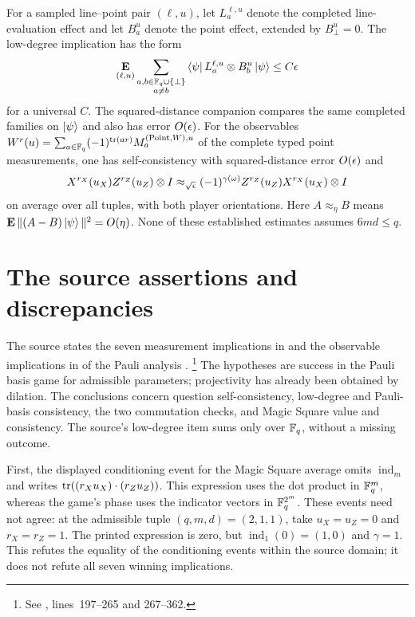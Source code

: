 \documentclass[11pt]{article}
\newcommand{\ind}{\operatorname{ind}}
\begin{document}
For a sampled line--point pair $(\ell,u)$, let $L_a^{\ell,u}$ denote the
completed line-evaluation effect and let $B_a^u$ denote the point effect,
extended by $B_\bot^u=0$. The low-degree implication has the form
\[
  \mathop{\bf E\/}_{(\ell,u)}\sum_{\substack{a,b\in\mathbb{F}_q\cup\{\bot\}\\a\ne b}}
    \bra\psi L_a^{\ell,u}\otimes B_b^u\ket\psi\leq C\epsilon
\]
for a universal $C$. The squared-distance companion compares the same
completed families on $\ket\psi$ and also has error $O(\epsilon)$.
For the observables
$W^r(u)=\sum_{a\in\mathbb{F}_q}(-1)^{\mathrm{tr}(ar)}M^{(\mathrm{Point},W),u}_a$
of the complete typed point measurements, one has self-consistency with
squared-distance error $O(\epsilon)$ and
\[
  X^{r_X}(u_X)Z^{r_Z}(u_Z)\otimes I
  \approx_{\sqrt{\epsilon}}
  (-1)^{\gamma(\omega)}Z^{r_Z}(u_Z)X^{r_X}(u_X)\otimes I
\]
on average over all tuples, with both player orientations. Here
$A\approx_\eta B$ means $\mathop{\bf E\/}\|(A-B)\ket\psi\|^2=O(\eta)$.
None of these established estimates assumes $6md\leq q$.

\section{The source assertions and discrepancies}

The source states the seven measurement implications in
 and the observable implications in
 of the Pauli analysis
\cite[Appendix~A, Strategies]{Ji2020MIPStar}.%
\footnote{See
,
lines~197--265 and 267--362.}
The hypotheses are success in the Pauli basis game for admissible parameters;
projectivity has already been obtained by dilation. The conclusions concern
question self-consistency, low-degree and Pauli-basis consistency, the two
commutation checks, and Magic Square value and consistency. The source's
low-degree item sums only over $\mathbb{F}_q$, without a missing outcome.

First, the displayed conditioning event for the Magic Square average omits
$\ind_m$ and writes $\mathrm{tr}((r_Xu_X)\cdot(r_Zu_Z))$. This expression uses the
dot product in $\mathbb{F}_q^m$, whereas the game's phase uses the indicator vectors
in $\mathbb{F}_q^{2^m}$. These events need not agree: at the admissible tuple
$(q,m,d)=(2,1,1)$, take $u_X=u_Z=0$ and $r_X=r_Z=1$. The printed expression
is zero, but $\ind_1(0)=(1,0)$ and $\gamma=1$. This refutes the equality of
the conditioning events within the source domain; it does not refute all
seven winning implications.
\end{document}
